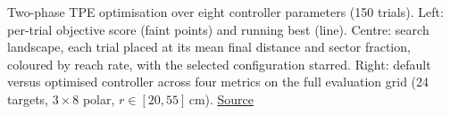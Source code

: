 Two-phase TPE optimisation over eight controller parameters (150 trials). Left: per-trial objective score (faint points) and running best (line). Centre: search landscape, each trial placed at its mean final distance and sector fraction, coloured by reach rate, with the selected configuration starred. Right: default versus optimised controller across four metrics on the full evaluation grid (24 targets, $3 \times 8$ polar, $r \in [20, 55]$\,cm). \href{https://github.com/tahmidazam/gg4/blob/main/notebooks/cartesian_control_sweep/cartesian_control_sweep.ipynb}{\underline{Source}}%
